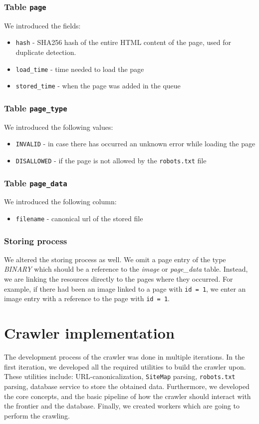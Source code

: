 \documentclass{article}
\begin{document}
\subsubsection{Table \texttt{page}}
We introduced the fields:
\begin{itemize}
    \item \texttt{hash} - SHA256 hash of the entire HTML content of the page, used for duplicate detection.
    \item \texttt{load\_time} - time needed to load the page
    \item \texttt{stored\_time} - when the page was added in the queue
\end{itemize}
\subsubsection{Table \texttt{page\_type}}
We introduced the following values:
\begin{itemize}
    \item \texttt{INVALID} - in case there has occurred an unknown error while loading the page
    \item \texttt{DISALLOWED} - if the page is not allowed by the \texttt{robots.txt} file
\end{itemize}

\subsubsection{Table \texttt{page\_data}}
We introduced the following column:
\begin{itemize}
    \item \texttt{filename} - canonical url of the stored file
\end{itemize}

\subsubsection{Storing process}
We altered the storing process as well. We omit a page entry of the type \textit{BINARY} which should be a reference to the \textit{image} or \textit{page\_data} table. Instead, we are linking the resources directly to the pages where they occurred. For example, if there had been an image linked to a page with \texttt{id = 1}, we enter an image entry with a reference to the page with \texttt{id = 1}.

\section{Crawler implementation}
The development process of the crawler was done in multiple iterations. In the first iteration, we developed all the required utilities to build the crawler upon. These utilities include: URL-canonicalization, \texttt{SiteMap} parsing, \texttt{robots.txt} parsing, database service to store the obtained data. Furthermore, we developed the core concepts, and the basic pipeline of how the crawler should interact with the frontier and the database. Finally, we created workers which are going to perform the crawling.
\end{document}

